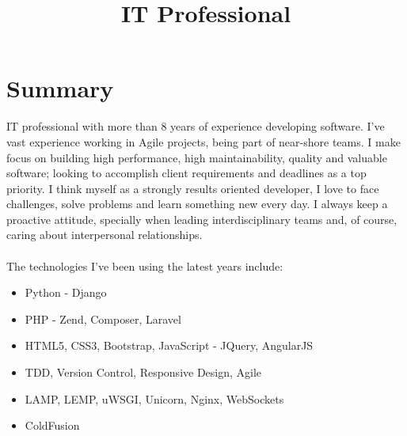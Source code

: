 \documentclass[11pt,a4paper,sans]{moderncv}        %
\title{IT Professional}                               %
\begin{document}
\makecvtitle

\section{Summary}
IT professional with more than 8 years of experience developing software.
I've vast experience working in Agile projects, being part of near-shore teams.
I make focus on building high performance, high maintainability, quality and valuable software; looking to accomplish client requirements and deadlines as a top priority.
I think myself as a strongly results oriented developer, I love to face challenges, solve problems and learn something new every day.
I always keep a proactive attitude, specially when leading interdisciplinary teams and, of course, caring about interpersonal relationships.\\\\
\medskip The technologies I've been using the latest years include:
\begin{itemize}
  \item Python - Django
  \item PHP - Zend, Composer, Laravel
  \item HTML5, CSS3, Bootstrap, JavaScript - JQuery, AngularJS
  \item TDD, Version Control, Responsive Design, Agile
  \item LAMP, LEMP, uWSGI, Unicorn, Nginx, WebSockets
  \item ColdFusion
\end{itemize}
\clearpage
\end{document}
